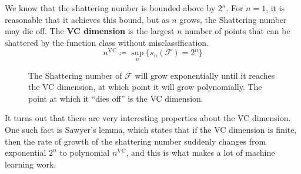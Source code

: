 \documentclass{article}
\begin{document}
  \begin{definition}[VC Dimension]
    We know that the shattering number is bounded above by $2^n$. For $n = 1$, it is reasonable that it achieves this bound, but as $n$ grows, the Shattering number may die off. The \textbf{VC dimension} is the largest $n$ number of points that can be shattered by the function class without misclassification. 
    \begin{equation}
      n^{\mathrm{VC}} \coloneqq \sup_n \{ s_n (\mathcal{F}) = 2^n \}
    \end{equation}

    \begin{figure}[H]
      \centering 
      \caption{The Shattering number of $\mathcal{F}$ will grow exponentially until it reaches the VC dimension, at which point it will grow polynomially. The point at which it ``dies off'' is the VC dimension.} 
      \label{fig:sawyer_lemma}
    \end{figure}
  \end{definition}

  It turns out that there are very interesting properties about the VC dimension. One such fact is Sawyer's lemma, which states that if the VC dimension is finite, then the rate of growth of the shattering number suddenly changes from exponential $2^n$ to polynomial $n^{\mathrm{VC}}$, and this is what makes a lot of machine learning work. 
\end{document}
